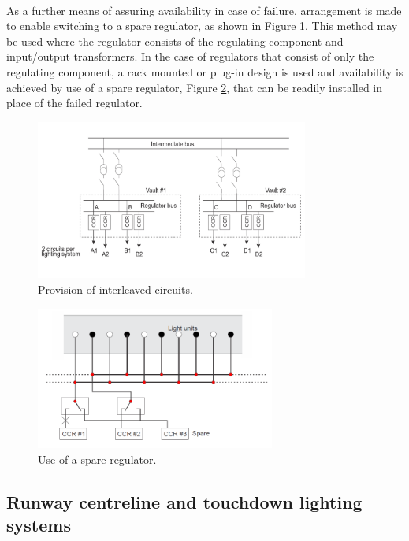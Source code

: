 	\paragraph{} As a further means of assuring availability in case of failure, arrangement is made to enable switching to a spare regulator, as shown in Figure \ref{interleaved}. This method may be used where the regulator consists of the regulating component and input/output transformers. In the case of regulators that consist of only the regulating component, a rack mounted or plug-in design is used and availability is achieved by use of a spare regulator, Figure \ref{spare}, that can be readily installed in
	place of the failed regulator.
	
	\begin{figure}[H]
		\centering
		\includegraphics[clip, trim=0cm 0cm 0cm 0cm, width=0.8\textwidth]{./images/electric/interleaved}
		\caption{Provision of interleaved circuits.}
		\label{interleaved}
	\end{figure}

	\begin{figure}[H]
		\centering
		\includegraphics[clip, trim=0cm 0cm 0cm 0cm, width=0.7\textwidth]{./images/electric/spare}
		\caption{Use of a spare regulator.}
		\label{spare}
	\end{figure}
	
	
		\subsection{Runway centreline and touchdown lighting systems}
